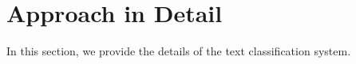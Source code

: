 \section{Approach in Detail}
In this section, we provide the details of the text classification system.

